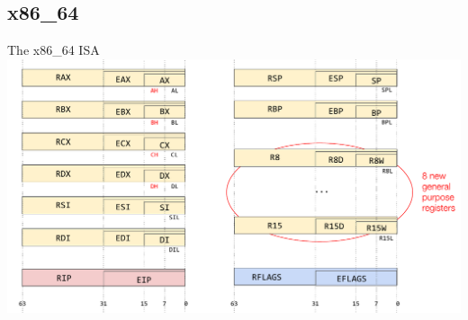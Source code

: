 \documentclass[]{beamer}
\begin{document}
\subsection{x86\_64}
\begin{frame}{The x86\_64 ISA}
  \centering
  \includegraphics[width=1\linewidth]{images/x86-64}
\end{frame}
\end{document}
